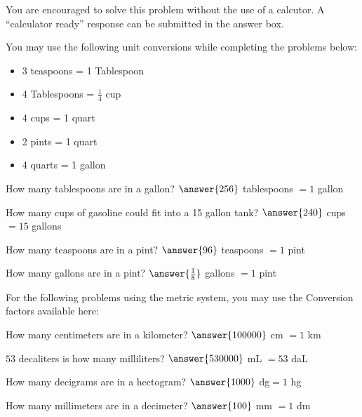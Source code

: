 \documentclass{ximera}
\author{David Kish}
\begin{document}
You are encouraged to solve this problem without the use of a calcutor. A ``calculator ready'' response can be submitted in the answer box.

You may use the following unit conversions while completing the problems below:
\begin{itemize}
\item 3 teaspoons = 1 Tablespoon
\item 4  Tablespoons = $\frac{1}{4}$ cup
\item 4 cups = 1 quart
\item 2 pints = 1 quart
\item 4 quarts = 1 gallon
\end{itemize}

\begin{exercise}
 How many tablespoons are in a gallon? 
 $\answer{256}$ tablespoons $= 1$ gallon
 \end{exercise}
  \begin{exercise}
 How many cups of gasoline could fit into a 15 gallon tank?
 $\answer{240}$ cups $= 15$ gallons
 \end{exercise}
  \begin{exercise}
 How many teaspoons are in a pint?
 $\answer{96}$ teaspoons $= 1$ pint
 \end{exercise}
  \begin{exercise}
 How many gallons are in a pint?
 $\answer{\frac{1}{8}}$ gallons $=1 $ pint
 \end{exercise}

For the following problems using the metric system, you may use the Conversion factors available here: 

  \begin{exercise}
 How many centimeters are in a kilometer? 
 $\answer{100000}$ cm $= 1$ km
 \end{exercise}
   \begin{exercise}
 $53$ decaliters is how many milliliters?
 $\answer{530000}$ mL $= 53$ daL
 \end{exercise}
   \begin{exercise}
 How many decigrams are in a hectogram? 
$ \answer{1000}$ dg$ = 1$ hg
 \end{exercise}
   \begin{exercise}
 How many millimeters are in a decimeter?
 $\answer{100}$ mm $= 1$ dm
 \end{exercise}
\end{document}
